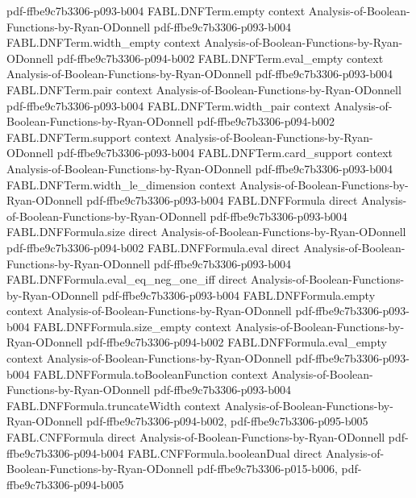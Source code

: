 \begin{theorem}
  {pdf-ffbe9c7b3306-p093-b004}
\proofstep
  {FABL.DNFTerm.empty}
  {context}
  {Analysis-of-Boolean-Functions-by-Ryan-ODonnell}
  {pdf-ffbe9c7b3306-p093-b004}
\proofstep
  {FABL.DNFTerm.width_empty}
  {context}
  {Analysis-of-Boolean-Functions-by-Ryan-ODonnell}
  {pdf-ffbe9c7b3306-p094-b002}
\proofstep
  {FABL.DNFTerm.eval_empty}
  {context}
  {Analysis-of-Boolean-Functions-by-Ryan-ODonnell}
  {pdf-ffbe9c7b3306-p093-b004}
\proofstep
  {FABL.DNFTerm.pair}
  {context}
  {Analysis-of-Boolean-Functions-by-Ryan-ODonnell}
  {pdf-ffbe9c7b3306-p093-b004}
\proofstep
  {FABL.DNFTerm.width_pair}
  {context}
  {Analysis-of-Boolean-Functions-by-Ryan-ODonnell}
  {pdf-ffbe9c7b3306-p094-b002}
\proofstep
  {FABL.DNFTerm.support}
  {context}
  {Analysis-of-Boolean-Functions-by-Ryan-ODonnell}
  {pdf-ffbe9c7b3306-p093-b004}
\proofstep
  {FABL.DNFTerm.card_support}
  {context}
  {Analysis-of-Boolean-Functions-by-Ryan-ODonnell}
  {pdf-ffbe9c7b3306-p093-b004}
\proofstep
  {FABL.DNFTerm.width_le_dimension}
  {context}
  {Analysis-of-Boolean-Functions-by-Ryan-ODonnell}
  {pdf-ffbe9c7b3306-p093-b004}
\proofstep
  {FABL.DNFFormula}
  {direct}
  {Analysis-of-Boolean-Functions-by-Ryan-ODonnell}
  {pdf-ffbe9c7b3306-p093-b004}
\proofstep
  {FABL.DNFFormula.size}
  {direct}
  {Analysis-of-Boolean-Functions-by-Ryan-ODonnell}
  {pdf-ffbe9c7b3306-p094-b002}
\proofstep
  {FABL.DNFFormula.eval}
  {direct}
  {Analysis-of-Boolean-Functions-by-Ryan-ODonnell}
  {pdf-ffbe9c7b3306-p093-b004}
\proofstep
  {FABL.DNFFormula.eval_eq_neg_one_iff}
  {direct}
  {Analysis-of-Boolean-Functions-by-Ryan-ODonnell}
  {pdf-ffbe9c7b3306-p093-b004}
\proofstep
  {FABL.DNFFormula.empty}
  {context}
  {Analysis-of-Boolean-Functions-by-Ryan-ODonnell}
  {pdf-ffbe9c7b3306-p093-b004}
\proofstep
  {FABL.DNFFormula.size_empty}
  {context}
  {Analysis-of-Boolean-Functions-by-Ryan-ODonnell}
  {pdf-ffbe9c7b3306-p094-b002}
\proofstep
  {FABL.DNFFormula.eval_empty}
  {context}
  {Analysis-of-Boolean-Functions-by-Ryan-ODonnell}
  {pdf-ffbe9c7b3306-p093-b004}
\proofstep
  {FABL.DNFFormula.toBooleanFunction}
  {context}
  {Analysis-of-Boolean-Functions-by-Ryan-ODonnell}
  {pdf-ffbe9c7b3306-p093-b004}
\proofstep
  {FABL.DNFFormula.truncateWidth}
  {context}
  {Analysis-of-Boolean-Functions-by-Ryan-ODonnell}
  {pdf-ffbe9c7b3306-p094-b002,
    pdf-ffbe9c7b3306-p095-b005}
\proofstep
  {FABL.CNFFormula}
  {direct}
  {Analysis-of-Boolean-Functions-by-Ryan-ODonnell}
  {pdf-ffbe9c7b3306-p094-b004}
\proofstep
  {FABL.CNFFormula.booleanDual}
  {direct}
  {Analysis-of-Boolean-Functions-by-Ryan-ODonnell}
  {pdf-ffbe9c7b3306-p015-b006,
    pdf-ffbe9c7b3306-p094-b005}

\end{theorem}
